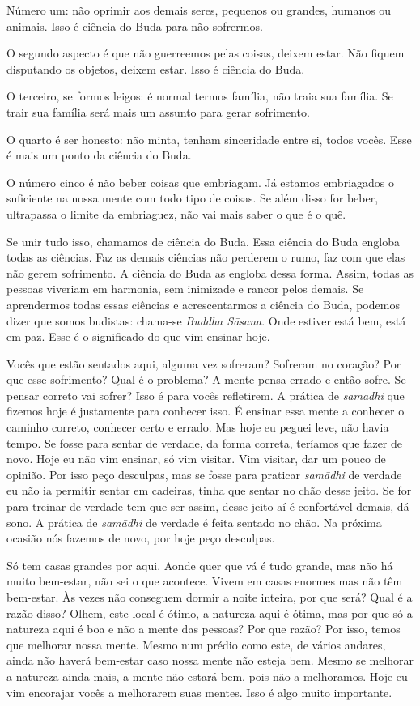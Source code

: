 Número um: não oprimir aos demais seres, pequenos ou grandes,
humanos ou animais. Isso é ciência do Buda para não sofrermos.

O segundo aspecto é que não guerreemos pelas coisas, deixem estar.
Não fiquem disputando os objetos, deixem estar. Isso é ciência do Buda.

O terceiro, se formos leigos: é normal termos família, não traia sua
família. Se trair sua família será mais um assunto para gerar
sofrimento.

O quarto é ser honesto: não minta, tenham sinceridade entre si,
todos vocês. Esse é mais um ponto da ciência do Buda.

O número cinco é não beber coisas que embriagam. Já estamos
embriagados o suficiente na nossa mente com todo tipo de coisas. Se
além disso for beber, ultrapassa o limite da embriaguez, não vai mais
saber o que é o quê. 

Se unir tudo isso, chamamos de ciência do Buda. Essa ciência do Buda
engloba todas as ciências. Faz as demais ciências não perderem o rumo,
faz com que elas não gerem sofrimento. A ciência do Buda as engloba
dessa forma. Assim, todas as pessoas viveriam em harmonia, sem
inimizade e rancor pelos demais. Se aprendermos todas essas ciências e
acrescentarmos a ciência do Buda, podemos dizer que somos budistas:
chama-se \textit{Buddha S\=asana}. Onde estiver está bem, está em paz.
Esse é o significado do que vim ensinar hoje.

Vocês que estão sentados aqui, alguma vez sofreram? Sofreram no
coração? Por que esse sofrimento? Qual é o problema? A mente pensa
errado e então sofre. Se pensar correto vai sofrer? Isso é para vocês
refletirem. A prática de \textit{sam\=adhi }que fizemos hoje é
justamente para conhecer isso. É ensinar essa mente a conhecer o
caminho correto, conhecer certo e errado. Mas hoje eu peguei leve, não
havia tempo. Se fosse para sentar de verdade, da forma correta,
teríamos que fazer de novo. Hoje eu não vim ensinar, só vim visitar.
Vim visitar, dar um pouco de opinião. Por isso peço desculpas, mas se
fosse para praticar \textit{sam\=adhi }de verdade eu não ia permitir
sentar em cadeiras, tinha que sentar no chão desse jeito. Se for para
treinar de verdade tem que ser assim, desse jeito aí é confortável
demais, dá sono. A prática de \textit{sam\=adhi }de verdade é feita
sentado no chão. Na próxima ocasião nós fazemos de novo, por hoje peço
desculpas.

Só tem casas grandes por aqui. Aonde quer que vá é tudo grande, mas
não há muito bem-estar, não sei o que acontece. Vivem em casas enormes
mas não têm bem-estar. Às vezes não conseguem dormir a noite inteira,
por que será? Qual é a razão disso? Olhem, este local é ótimo, a
natureza aqui é ótima, mas por que só a natureza aqui é boa e não a
mente das pessoas? Por que razão? Por isso, temos que melhorar nossa
mente. Mesmo num prédio como este, de vários andares, ainda não haverá
bem-estar caso nossa mente não esteja bem. Mesmo se melhorar a natureza
ainda mais, a mente não estará bem, pois não a melhoramos. Hoje eu vim
encorajar vocês a melhorarem suas mentes. Isso é algo muito importante.


